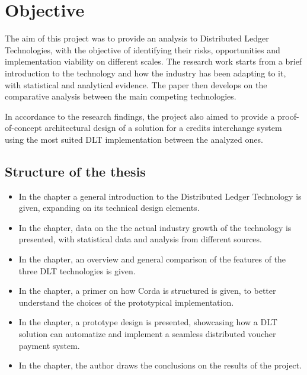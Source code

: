 
\newpage

\mbox{}\vfill
\chapter*{\centering Objective}

The aim of this project was to provide an analysis to Distributed Ledger Technologies, with the objective of identifying their risks, opportunities and implementation viability on different scales. The research work starts from a brief introduction to the technology and how the industry has been adapting to it, with statistical and analytical evidence. The paper then develops on the comparative analysis between the main competing technologies.

In accordance to the research findings, the project also aimed to provide a proof-of-concept architectural design of a solution for a credits interchange system using the most suited DLT implementation between the analyzed ones.

\section*{Structure of the thesis}

\begin{itemize}

    \item In the  chapter a general introduction to the Distributed Ledger Technology is given, expanding on its technical design elements.

    \item In the  chapter, data on the the actual industry growth of the technology is presented, with statistical data and analysis from different sources.

    \item In the  chapter, an overview and general comparison of the features of the three DLT technologies is given.

    \item In the  chapter, a primer on how Corda is structured is given, to better understand the choices of the prototypical implementation.

    \item In the  chapter, a prototype design is presented, showcasing how a DLT solution can automatize and implement a seamless distributed voucher payment system.

    \item In the  chapter, the author draws the conclusions on the results of the project.


\end{itemize}

\mbox{}\vfill
